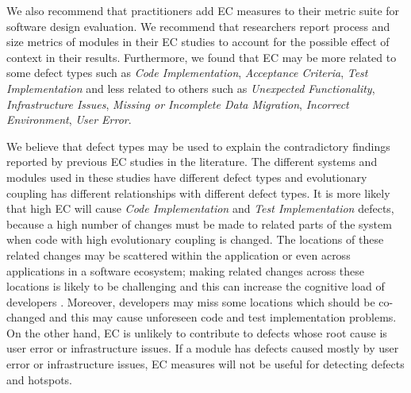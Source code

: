 \documentclass[times]{smrauth}
\begin{document}
We also recommend that practitioners add EC measures to their metric suite for software design evaluation. We recommend that researchers report process and size metrics of modules in their EC studies to account for the possible effect of context in their results. Furthermore, we found that EC may be more related to some defect types such as \textit{Code Implementation}, \textit{Acceptance Criteria}, \textit{Test Implementation} and less related to others such as \textit{Unexpected Functionality}, \textit{Infrastructure Issues}, \textit{Missing or Incomplete Data Migration}, \textit{Incorrect Environment}, \textit{User Error}. 

We believe that defect types may be used to explain the contradictory findings reported by previous EC studies in the literature. The different systems and modules used in these studies have different defect types and evolutionary coupling has different relationships with different defect types. It is more likely that high EC will cause \textit{Code Implementation} and \textit{Test Implementation} defects, because a high number of changes must be made to related parts of the system when code with high evolutionary coupling is changed. The locations of these related changes may be scattered within the application or even across applications in a software ecosystem; making related changes across these locations is likely to be challenging and this can increase the cognitive load of developers \cite{COGS:COGS57}. Moreover, developers may miss some locations which should be co-changed and this may cause unforeseen code and test implementation problems. On the other hand, EC is unlikely to contribute to defects whose root cause is user error or infrastructure issues. If a module has defects caused mostly by user error or infrastructure issues, EC measures will not be useful for detecting defects and hotspots.

\end{document}
